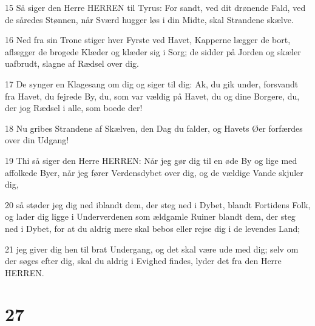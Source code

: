 \par 15 Så siger den Herre HERREN til Tyrus: For sandt, ved dit drønende Fald, ved de såredes Stønnen, når Sværd hugger løs i din Midte, skal Strandene skælve.
\par 16 Ned fra sin Trone stiger hver Fyrste ved Havet, Kapperne lægger de bort, aflægger de brogede Klæder og klæder sig i Sorg; de sidder på Jorden og skæler uafbrudt, slagne af Rædsel over dig.
\par 17 De synger en Klagesang om dig og siger til dig: Ak, du gik under, forsvandt fra Havet, du fejrede By, du, som var vældig på Havet, du og dine Borgere, du, der jog Rædsel i alle, som boede der!
\par 18 Nu gribes Strandene af Skælven, den Dag du falder, og Havets Øer forfærdes over din Udgang!
\par 19 Thi så siger den Herre HERREN: Når jeg gør dig til en øde By og lige med affolkede Byer, når jeg fører Verdensdybet over dig, og de vældige Vande skjuler dig,
\par 20 så støder jeg dig ned iblandt dem, der steg ned i Dybet, blandt Fortidens Folk, og lader dig ligge i Underverdenen som ældgamle Ruiner blandt dem, der steg ned i Dybet, for at du aldrig mere skal bebos eller rejse dig i de levendes Land;
\par 21 jeg giver dig hen til brat Undergang, og det skal være ude med dig; selv om der søges efter dig, skal du aldrig i Evighed findes, lyder det fra den Herre HERREN.

\chapter{27}

